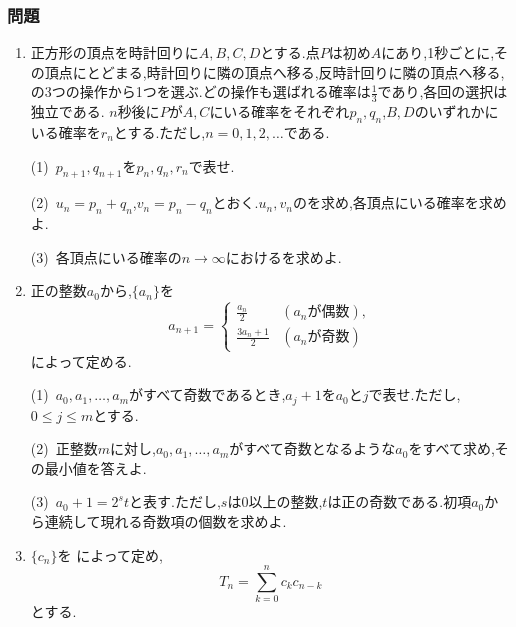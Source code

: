 \subsubsection{問題}\label{節：発展：問題}
\begin{enumerate}[label=\textbf{問\arabic*.},leftmargin=3.8em,format=\bookitemlink{practice-entrance}{problem}{hint}]
  \item 正方形の頂点を時計回りに$A,B,C,D$とする.点$P$は初め$A$にあり,1秒ごとに,その頂点にとどまる,時計回りに隣の頂点へ移る,反時計回りに隣の頂点へ移る,の3つの操作から1つを選ぶ.どの操作も選ばれる確率は$\frac13$であり,各回の選択は独立である.
    $n$秒後に$P$が$A,C$にいる確率をそれぞれ$p_n,q_n$,$B,D$のいずれかにいる確率を$r_n$とする.ただし,$n=0,1,2,\ldots$である.

    \smallskip
    \noindent (1)~$p_{n+1},q_{n+1}$を$p_n,q_n,r_n$で表せ.

    \smallskip
    \noindent (2)~$u_n=p_n+q_n$,$v_n=p_n-q_n$とおく.$u_n,v_n$のを求め,各頂点にいる確率を求めよ.

    \smallskip
    \noindent (3)~各頂点にいる確率の$n\to\infty$におけるを求めよ.
    \par{}
  \item 正の整数$a_0$から,$\{a_n\}$を
    \[
      a_{n+1}=\begin{cases}
        \frac{a_n}{2}&(a_n\text{が偶数}),\\[3pt]
        \frac{3a_n+1}{2}&(a_n\text{が奇数})
      \end{cases}
    \]
    によって定める.

    \smallskip
    \noindent (1)~$a_0,a_1,\ldots,a_m$がすべて奇数であるとき,$a_j+1$を$a_0$と$j$で表せ.ただし,$0\le j\le m$とする.

    \smallskip
    \noindent (2)~正整数$m$に対し,$a_0,a_1,\ldots,a_m$がすべて奇数となるような$a_0$をすべて求め,その最小値を答えよ.

    \smallskip
    \noindent (3)~$a_0+1=2^s t$と表す.ただし,$s$は$0$以上の整数,$t$は正の奇数である.初項$a_0$から連続して現れる奇数項の個数を求めよ.
    \par{}
  \item {}$\{c_n\}$を
    \BookMathLayout{\[
        c_0=1,\qquad
        c_{n+1}=\frac{2n+1}{2n+2}c_n
        \quad(n=0,1,2,\ldots)
      \]}{
      \[
        \begin{aligned}
          c_0&=1,\\
          c_{n+1}&=\frac{2n+1}{2n+2}c_n\\
          &\quad(n=0,1,2,\ldots)
        \end{aligned}
      \]
    }
    によって定め,
    \[
      T_n=\sum_{k=0}^{n}c_kc_{n-k}
    \]
    とする.


\end{enumerate}
